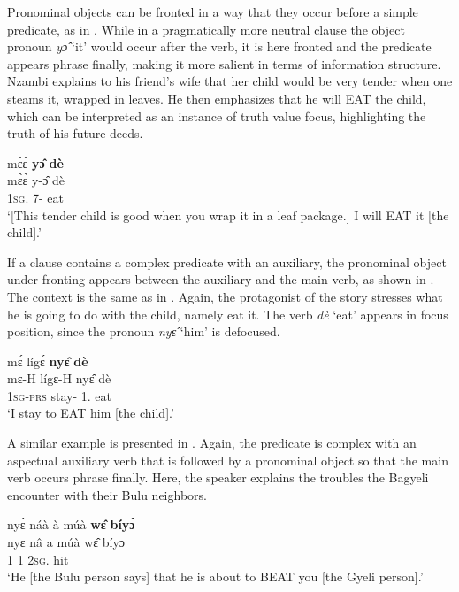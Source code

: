 Pronominal objects can be fronted in a way that they occur before a simple predicate, as in . While in a pragmatically more neutral clause the object pronoun {\itshape yɔ̂} `it' would occur after the verb, it is here fronted and the predicate appears phrase finally, making it more salient in terms of information structure. Nzambi explains to his friend's wife that her child would be very tender when one steams it, wrapped in leaves. He then emphasizes that he will EAT the child, which can be interpreted as an instance of truth value focus, highlighting the truth of his future deeds.


\ea \label{front1} 
  \glll mɛ̀ɛ̀ {\bfseries yɔ̂} {\bfseries dè}\\
         mɛ̀ɛ̀ y-ɔ̂ dè\\
        1\textsc{sg}.{\FUT} 7-{\OBJ} eat\\
    \trans `[This tender child is good when you wrap it in a  leaf package.] I will EAT it [the child].'
\z

If a clause contains a complex predicate with an auxiliary, the pronominal object under fronting appears between the auxiliary and the main verb, as shown in . The context is the same as in . Again, the protagonist of the story stresses what he is going to do with the child, namely eat it. The verb {\itshape dè} `eat' appears in focus position, since the pronoun {\itshape nyɛ̂} `him' is defocused.

\ea \label{front2}
  \glll  mɛ́ lígɛ́ {\bfseries nyɛ̂} {\bfseries dè} \\
        mɛ-H lígɛ-H nyɛ̂ dè \\
         1\textsc{sg}-\textsc{prs} stay-{\R} 1.{\OBJ} eat\\
    \trans `I stay to EAT him [the child].'
\z

A similar example is presented in . Again, the predicate is complex with an aspectual auxiliary verb that is followed by a pronominal object so that the main verb occurs phrase finally. Here, the speaker explains the troubles the Bagyeli encounter with their Bulu neighbors.

\ea \label{front3}
  \glll  nyɛ̀ náà à múà {\bfseries wɛ̂} {\bfseries bíyɔ̀} \\
        nyɛ nâ a múà wɛ̂ bíyɔ \\
           1 {\COMP} 1 {\PROSP} 2\textsc{sg}.{\OBJ} hit\\
    \trans `He [the Bulu person says] that he is about to BEAT you [the Gyeli person].'
\z

